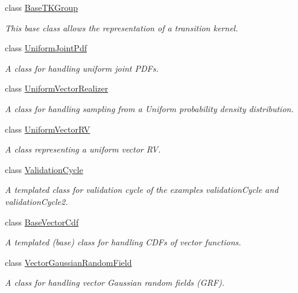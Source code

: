 \begin{DoxyCompactItemize}
class \hyperlink{class_q_u_e_s_o_1_1_base_t_k_group}{Base\-T\-K\-Group}
\begin{DoxyCompactList}\small\item\em This base class allows the representation of a transition kernel. \end{DoxyCompactList}\item 
class \hyperlink{class_q_u_e_s_o_1_1_uniform_joint_pdf}{Uniform\-Joint\-Pdf}
\begin{DoxyCompactList}\small\item\em A class for handling uniform joint P\-D\-Fs. \end{DoxyCompactList}\item 
class \hyperlink{class_q_u_e_s_o_1_1_uniform_vector_realizer}{Uniform\-Vector\-Realizer}
\begin{DoxyCompactList}\small\item\em A class for handling sampling from a Uniform probability density distribution. \end{DoxyCompactList}\item 
class \hyperlink{class_q_u_e_s_o_1_1_uniform_vector_r_v}{Uniform\-Vector\-R\-V}
\begin{DoxyCompactList}\small\item\em A class representing a uniform vector R\-V. \end{DoxyCompactList}\item 
class \hyperlink{class_q_u_e_s_o_1_1_validation_cycle}{Validation\-Cycle}
\begin{DoxyCompactList}\small\item\em A templated class for validation cycle of the examples validation\-Cycle and validation\-Cycle2. \end{DoxyCompactList}\item 
class \hyperlink{class_q_u_e_s_o_1_1_base_vector_cdf}{Base\-Vector\-Cdf}
\begin{DoxyCompactList}\small\item\em A templated (base) class for handling C\-D\-Fs of vector functions. \end{DoxyCompactList}\item 
class \hyperlink{class_q_u_e_s_o_1_1_vector_gaussian_random_field}{Vector\-Gaussian\-Random\-Field}
\begin{DoxyCompactList}\small\item\em A class for handling vector Gaussian random fields (G\-R\-F). \end{DoxyCompactList}\item 

\end{DoxyCompactItemize}
